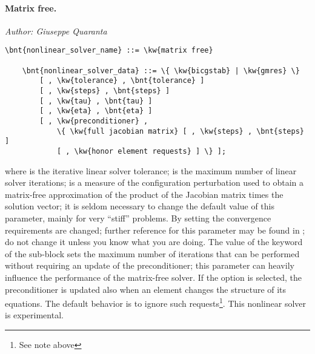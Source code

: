 \paragraph{Matrix free.}
\emph{Author: Giuseppe Quaranta}
\begin{Verbatim}[commandchars=\\\{\}]
    \bnt{nonlinear_solver_name} ::= \kw{matrix free}

    \bnt{nonlinear_solver_data} ::= \{ \kw{bicgstab} | \kw{gmres} \}
        [ , \kw{tolerance} , \bnt{tolerance} ]
        [ , \kw{steps} , \bnt{steps} ]
        [ , \kw{tau} , \bnt{tau} ]
        [ , \kw{eta} , \bnt{eta} ]
        [ , \kw{preconditioner} ,
            \{ \kw{full jacobian matrix} [ , \kw{steps} , \bnt{steps} ] 
	        [ , \kw{honor element requests} ] \} ];
\end{Verbatim}
where  is the iterative linear solver tolerance;
 is the maximum number of linear solver iterations;
 is a measure of the configuration perturbation used
to obtain a matrix-free approximation of the product
of the Jacobian matrix times the solution vector;
it is seldom necessary to change the default value of this parameter,
mainly for very ``stiff'' problems.
By setting  the convergence requirements are changed; 
further reference for this parameter may be found in \cite{KELLEY-1995}; 
do not change it unless you know what you are doing.
The value  of the  keyword 
of the  sub-block 
sets the maximum number of iterations that can be performed 
without requiring an update of the preconditioner; 
this parameter can heavily influence
the performance of the matrix-free solver.
If the option  is selected, the preconditioner
is updated also when an element changes the structure of its equations.
The default behavior is to ignore such requests\footnote{See note above}.
This nonlinear solver is experimental.


